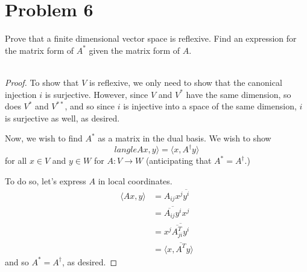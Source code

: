 \documentclass[fontsize=11pt]{scrartcl} %
\numberwithin{equation}{section} %
\numberwithin{figure}{section} %
\numberwithin{table}{section} %
\begin{document}
\section*{Problem 6}
Prove that a finite dimensional vector space is reflexive. Find an expression
for the matrix form of $A^*$ given the matrix form of $A$.
\\
\\
\begin{proof}
    To show that $V$ is reflexive, we only need to show that the canonical
    injection $i$ is surjective. However, since $V$ and $V^*$ have the same
    dimension, so does $V^*$ and $V^{**}$, and so since $i$ is injective into a
    space of the same dimension, $i$ is surjective as well, as desired.

    Now, we wish to find $A^*$ as a matrix in the dual basis. We wish to show
    \[
        langle Ax,y\rangle = \langle x,A^{\dagger}y\rangle
    \]
    for all $x\in V$ and $y\in W$ for $A:V\to W$ (anticipating that $A^* =
    A^{\dagger}$.)

    To do so, let's express $A$ in local coordinates.
    \[
        \begin{aligned}
            \langle Ax,y\rangle &= A_{ij}x^j\overline{y^i}\\
            &= \overline{\overline{A_{ij}}y^i}x^j\\
            &= x^j\overline{\overline{A_{ji}^T}y^i}\\
            &= \langle x, \overline{A^T}y\rangle
        \end{aligned}
    \]
    and so $A^* = A^{\dagger}$, as desired.
\end{proof}
\end{document}
